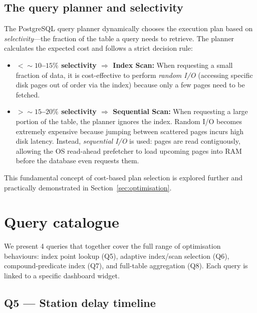 \documentclass[a4paper,11pt]{article}
\begin{document}
\subsection{The query planner and selectivity}

The PostgreSQL query planner dynamically chooses the execution plan based on \emph{selectivity}---the fraction of the table a query needs to retrieve. The planner calculates the expected cost and follows a strict decision rule:
\begin{itemize}
  \item \textbf{$<{\sim}10$--$15\%$ selectivity $\Rightarrow$ Index Scan:} When requesting a small fraction of data, it is cost-effective to perform \emph{random I/O} (accessing specific disk pages out of order via the index) because only a few pages need to be fetched.
  \item \textbf{$>{\sim}15$--$20\%$ selectivity $\Rightarrow$ Sequential Scan:} When requesting a large portion of the table, the planner ignores the index. Random I/O becomes extremely expensive because jumping between scattered pages incurs high disk latency. Instead, \emph{sequential I/O} is used: pages are read contiguously, allowing the OS read-ahead prefetcher to load upcoming pages into RAM before the database even requests them.
\end{itemize}
This fundamental concept of cost-based plan selection is explored further and practically demonstrated in Section~\ref{sec:optimisation}.


\newpage
\section{Query catalogue}
\label{sec:queries}

\noindent
We present 4 queries that together cover the full range of optimisation
behaviours: index point lookup (Q5), adaptive index/scan selection (Q6),
compound-predicate index (Q7), and full-table aggregation (Q8).
Each query is linked to a specific dashboard widget.


\subsection{Q5 --- Station delay timeline}
\end{document}
